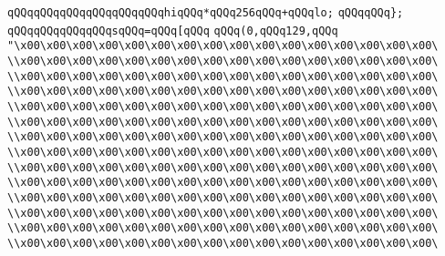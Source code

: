 \newline
\verb|qQQqqQQqqQQqqQQqqQQqqQQqhiqQQq*qQQq256qQQq+qQQqlo;|\newline
\verb|qQQqqQQq};|\newline
\verb|qQQqqQQqqQQqqQQqsqQQq=qQQq[qQQq|\newline
\verb|qQQq(0,qQQq129,qQQq|\newline
\verb|"\x00\x00\x00\x00\x00\x00\x00\x00\x00\x00\x00\x00\x00\x00\x00\x00\|\newline
\verb|\\x00\x00\x00\x00\x00\x00\x00\x00\x00\x00\x00\x00\x00\x00\x00\x00\|\newline
\verb|\\x00\x00\x00\x00\x00\x00\x00\x00\x00\x00\x00\x00\x00\x00\x00\x00\|\newline
\verb|\\x00\x00\x00\x00\x00\x00\x00\x00\x00\x00\x00\x00\x00\x00\x00\x00\|\newline
\verb|\\x00\x00\x00\x00\x00\x00\x00\x00\x00\x00\x00\x00\x00\x00\x00\x00\|\newline
\verb|\\x00\x00\x00\x00\x00\x00\x00\x00\x00\x00\x00\x00\x00\x00\x00\x00\|\newline
\verb|\\x00\x00\x00\x00\x00\x00\x00\x00\x00\x00\x00\x00\x00\x00\x00\x00\|\newline
\verb|\\x00\x00\x00\x00\x00\x00\x00\x00\x00\x00\x00\x00\x00\x00\x00\x00\|\newline
\verb|\\x00\x00\x00\x00\x00\x00\x00\x00\x00\x00\x00\x00\x00\x00\x00\x00\|\newline
\verb|\\x00\x00\x00\x00\x00\x00\x00\x00\x00\x00\x00\x00\x00\x00\x00\x00\|\newline
\verb|\\x00\x00\x00\x00\x00\x00\x00\x00\x00\x00\x00\x00\x00\x00\x00\x00\|\newline
\verb|\\x00\x00\x00\x00\x00\x00\x00\x00\x00\x00\x00\x00\x00\x00\x00\x00\|\newline
\verb|\\x00\x00\x00\x00\x00\x00\x00\x00\x00\x00\x00\x00\x00\x00\x00\x00\|\newline
\verb|\\x00\x00\x00\x00\x00\x00\x00\x00\x00\x00\x00\x00\x00\x00\x00\x00\|\newline
